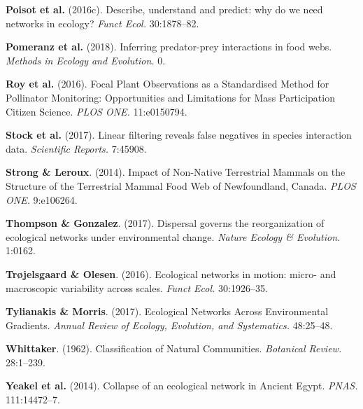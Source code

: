 \leavevmode\hypertarget{ref-PoisStou16}{}%
\textbf{Poisot et al.} (2016c). Describe, understand and predict: why do
we need networks in ecology? \emph{Funct Ecol.} 30:1878--82.

\leavevmode\hypertarget{ref-PomeThom18}{}%
\textbf{Pomeranz et al.} (2018). Inferring predator-prey interactions in
food webs. \emph{Methods in Ecology and Evolution.} 0.

\leavevmode\hypertarget{ref-RoyBaxt16}{}%
\textbf{Roy et al.} (2016). Focal Plant Observations as a Standardised
Method for Pollinator Monitoring: Opportunities and Limitations for Mass
Participation Citizen Science. \emph{PLOS ONE.} 11:e0150794.

\leavevmode\hypertarget{ref-StocPois17}{}%
\textbf{Stock et al.} (2017). Linear filtering reveals false negatives
in species interaction data. \emph{Scientific Reports.} 7:45908.

\leavevmode\hypertarget{ref-StroLero14}{}%
\textbf{Strong \& Leroux}. (2014). Impact of Non-Native Terrestrial
Mammals on the Structure of the Terrestrial Mammal Food Web of
Newfoundland, Canada. \emph{PLOS ONE.} 9:e106264.

\leavevmode\hypertarget{ref-ThomGonz17}{}%
\textbf{Thompson \& Gonzalez}. (2017). Dispersal governs the
reorganization of ecological networks under environmental change.
\emph{Nature Ecology \& Evolution.} 1:0162.

\leavevmode\hypertarget{ref-TrojOles16}{}%
\textbf{Trøjelsgaard \& Olesen}. (2016). Ecological networks in motion:
micro- and macroscopic variability across scales. \emph{Funct Ecol.}
30:1926--35.

\leavevmode\hypertarget{ref-TyliMorr17}{}%
\textbf{Tylianakis \& Morris}. (2017). Ecological Networks Across
Environmental Gradients. \emph{Annual Review of Ecology, Evolution, and
Systematics.} 48:25--48.

\leavevmode\hypertarget{ref-Whit62}{}%
\textbf{Whittaker}. (1962). Classification of Natural Communities.
\emph{Botanical Review.} 28:1--239.

\leavevmode\hypertarget{ref-YeakPire14}{}%
\textbf{Yeakel et al.} (2014). Collapse of an ecological network in
Ancient Egypt. \emph{PNAS.} 111:14472--7. 
